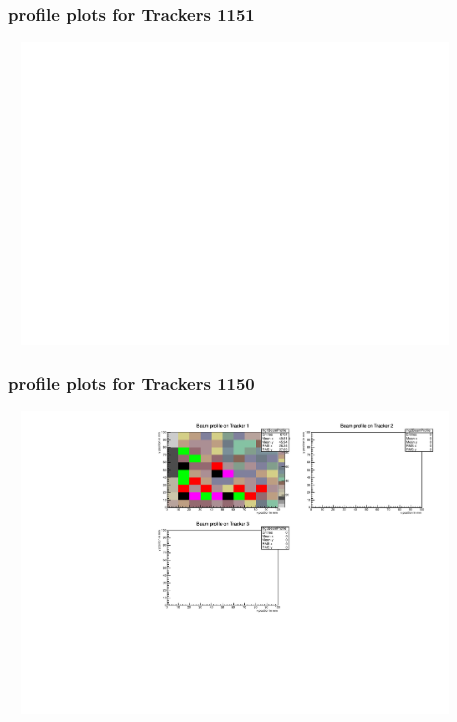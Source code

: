 \documentclass[slidestop,compress,mathserif]{beamer}
\begin{document}
\begin{frame}\frametitle{profile plots for Trackers 1151}
	 \includegraphics[width=12cm,height=8cm]{profile_plots_for_Trackers_1151.pdf}
\end{frame}
\begin{frame}\frametitle{profile plots for Trackers 1150}
	 \includegraphics[width=12cm,height=8cm]{profile_plots_for_Trackers_1150.pdf}
\end{frame}
\end{document}
